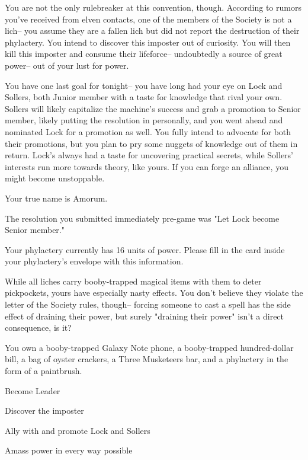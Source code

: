 \documentclass[char]{Sel}
\begin{document}
You are not the only rulebreaker at this convention, though. According to rumors you've received from elven contacts, one of the members of the Society is not a lich-- you assume they are a fallen lich but did not report the destruction of their phylactery. You intend to discover this imposter out of curiosity. You will then kill this imposter and consume their lifeforce-- undoubtedly a source of great power-- out of your lust for power.

You have one last goal for tonight-- you have long had your eye on Lock and Sollers, both Junior member with a taste for knowledge that rival your own. Sollers will likely capitalize the machine's success and grab a promotion to Senior member, likely putting the resolution in personally, and you went ahead and nominated Lock for a promotion as well. You fully intend to advocate for both their promotions, but you plan to pry some nuggets of knowledge out of them in return. Lock's always had a taste for uncovering practical secrets, while Sollers' interests run more towards theory, like yours. If you can forge an alliance, you might become unstoppable.

\begin{itemz}[Notes]
  \item Your true name is Amorum.
  \item The resolution you submitted immediately pre-game was "Let Lock become Senior member."
      \item Your phylactery currently has 16 units of power. Please fill in the card inside your phylactery's envelope with this information.
   \item While all liches carry booby-trapped magical items with them to deter pickpockets, yours have especially nasty effects. You don't believe they violate the letter of the Society rules, though-- forcing someone to cast a spell has the side effect of draining their power, but surely "draining their power" isn't a direct consequence, is it?
\item You own a booby-trapped Galaxy Note phone, a booby-trapped hundred-dollar bill, a bag of oyster crackers, a Three Musketeers bar, and a phylactery in the form of a paintbrush.
    \end{itemz}
   
    
 \begin{itemz}[Goals]
\item Become Leader
\item Discover the imposter
\item Ally with and promote Lock and Sollers
\item Amass power in every way possible
\end{itemz}
\end{document}
